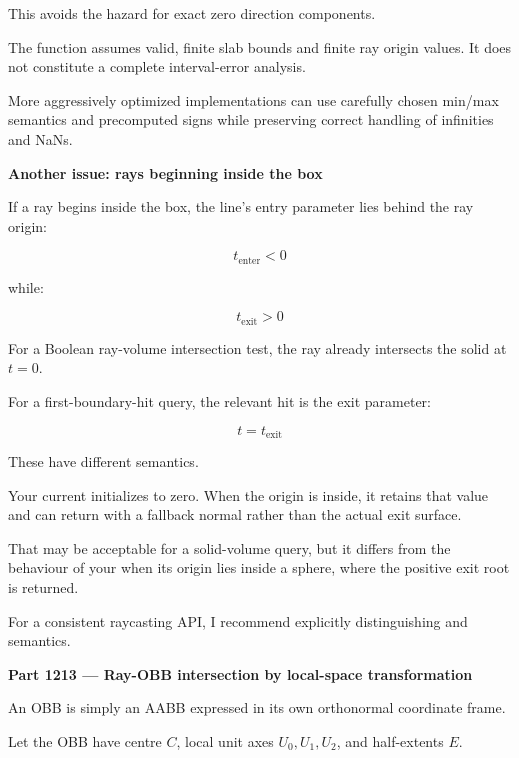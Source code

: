 This avoids the  hazard for exact zero direction components.

The function assumes valid, finite slab bounds and finite ray origin values. It does not constitute a complete interval-error analysis.

More aggressively optimized implementations can use carefully chosen min/max semantics and precomputed signs while preserving correct handling of infinities and NaNs.

\textbf{Another issue: rays beginning inside the box}

If a ray begins inside the box, the line's entry parameter lies behind the ray origin:

\[
t_{\mathrm{enter}}<0
\]

while:

\[
t_{\mathrm{exit}}>0
\]

For a Boolean ray-volume intersection test, the ray already intersects the solid at \(t=0\).

For a first-boundary-hit query, the relevant hit is the exit parameter:

\[
\boxed{t=t_{\mathrm{exit}}}
\]

These have different semantics.

Your current  initializes  to zero. When the origin is inside, it retains that value and can return  with a fallback normal rather than the actual exit surface.

That may be acceptable for a solid-volume query, but it differs from the behaviour of your  when its origin lies inside a sphere, where the positive exit root is returned.

For a consistent raycasting API, I recommend explicitly distinguishing  and  semantics.

\textbf{Part 1213 --- Ray-OBB intersection by local-space transformation}

An OBB is simply an AABB expressed in its own orthonormal coordinate frame.

Let the OBB have centre \(C\), local unit axes \(U_0,U_1,U_2\), and half-extents \(E\).

